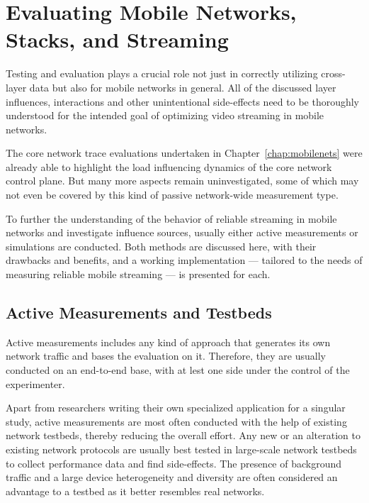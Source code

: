 \chapter{Evaluating Mobile Networks, Stacks, and Streaming}
\label{chap:mobilestreaming-measurements}

Testing and evaluation plays a crucial role not just in correctly utilizing cross-layer data but also for mobile networks in general. All of the discussed layer influences, interactions and other unintentional side-effects need to be thoroughly understood for the intended goal of optimizing video streaming in mobile networks.

The core network trace evaluations undertaken in Chapter~\ref{chap:mobilenets} were already able to highlight the load influencing dynamics of the core network control plane. But many more aspects remain uninvestigated, some of which may not even be covered by this kind of passive network-wide measurement type.

To further the understanding of the behavior of reliable streaming in mobile networks and investigate influence sources, usually either active measurements or simulations are conducted. Both methods are discussed here, with their drawbacks and benefits, and a working implementation --- tailored to the needs of measuring reliable mobile streaming --- is presented for each.


\section{Active Measurements and Testbeds}

Active measurements includes any kind of approach that generates its own network traffic and bases the evaluation on it. Therefore, they are usually conducted on an end-to-end base, with at lest one side under the control of the experimenter.

Apart from researchers writing their own specialized application for a singular study, active measurements are most often conducted with the help of existing network testbeds, thereby reducing the overall effort.
Any new or an alteration to existing network protocols are usually best tested in large-scale network testbeds to collect performance data and find side-effects. The presence of background traffic and a large device heterogeneity and diversity are often considered an advantage to a testbed as it better resembles real networks.

